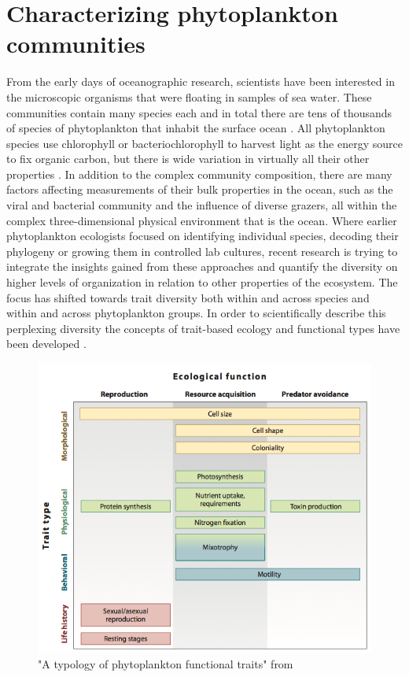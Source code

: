 \section{Characterizing phytoplankton communities}
From the early days of oceanographic research, scientists have been interested in the microscopic organisms that were floating in samples of sea water. These communities contain many species each and in total there are tens of thousands of species of phytoplankton that inhabit the surface ocean \citep{DeVargas2015}. All phytoplankton species use chlorophyll or bacteriochlorophyll to harvest light as the energy source to fix organic carbon, but there is wide variation in virtually all their other properties \citep{Litchman2008}. In addition to the complex community composition, there are many factors affecting measurements of their bulk properties in the ocean, such as the viral and bacterial community and the influence of diverse grazers, all within the complex three-dimensional physical environment that is the ocean. 
Where earlier phytoplankton ecologists focused on identifying individual species, decoding their phylogeny or growing them in controlled lab cultures, recent research is trying to integrate the insights gained from these approaches and quantify the diversity on higher levels of organization in relation to other properties of the ecosystem. The focus has shifted towards trait diversity both within and across species and within and across phytoplankton groups. In order to scientifically describe this perplexing diversity the concepts of trait-based ecology and functional types have been developed \citep{Tilman2001,McGill2006,Violle2007c}.

\begin{figure}
\centering
\includegraphics[width=0.7\linewidth]{./Chp1-Intro/Fig_litchman2008.png}
\caption[Scheme]{\small{"A typology of phytoplankton functional traits" from \cite{Litchman2008}}}
\label{PhytoTraits}
\end{figure}

